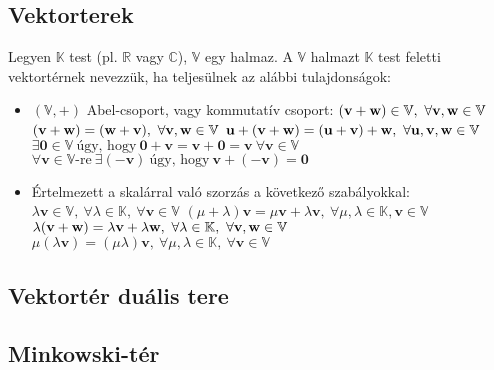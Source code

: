 \documentclass[a4paper,12pt]{article}
\begin{document}
\subsection{Vektorterek}
Legyen $\mathbb{K}$ test (pl. $\mathbb{R}$ vagy $\mathbb{C}$), $\mathbb{V}$ egy halmaz. A $\mathbb{V}$ halmazt $\mathbb{K}$ test feletti
vektortérnek nevezzük, ha teljesülnek az alábbi tulajdonságok:
\begin{itemize}
\item $(\mathbb{V}, +)$ Abel-csoport, vagy kommutatív csoport:
\subitem $(\mathbf{v} + \mathbf{w}) \in \mathbb{V}, ~ \forall \mathbf{v}, \mathbf{w} \in \mathbb{V}$
\subitem $(\mathbf{v} + \mathbf{w}) = (\mathbf{w} + \mathbf{v}), ~ \forall \mathbf{v}, \mathbf{w} \in \mathbb{V}$
\subitem $\mathbf{u} + (\mathbf{v} + \mathbf{w}) =(\mathbf{u} + \mathbf{v}) + \mathbf{w}, ~ \forall \mathbf{u},\mathbf{v}, \mathbf{w} \in \mathbb{V}$
\subitem $\exists \mathbf{0} \in \mathbb{V} ~ \textrm{úgy, hogy} ~ \mathbf{0} + \mathbf{v} = \mathbf{v} + \mathbf{0} = \mathbf{v} ~ \forall \mathbf{v}\in\mathbb{V}$
\subitem $ \forall \mathbf{v}\in\mathbb{V}\textrm{-re} ~ \exists (-\mathbf{v}) ~ \textrm{úgy, hogy} ~  \mathbf{v}+(-\mathbf{v})=\mathbf{0}$

\item Értelmezett a skalárral való szorzás a következő szabályokkal:
\subitem $\lambda \mathbf{v} \in \mathbb V, ~ \forall \lambda \in \mathbb{K}, ~ \forall \mathbf{v} \in \mathbb{V}$
\subitem $(\mu + \lambda) \mathbf{v} = \mu \mathbf{v} + \lambda\mathbf{v} , ~ \forall \mu, \lambda \in \mathbb{K}, \mathbf{v} \in \mathbb{V}$
\subitem $\lambda (\mathbf{v} + \mathbf{w}) = \lambda \mathbf{v} + \lambda \mathbf{w}, ~ \forall \lambda \in \mathbb{K}, ~ \forall \mathbf{v}, \mathbf{w} \in \mathbb{V}$
\subitem $\mu (\lambda \mathbf{v}) = (\mu \lambda)\mathbf{v} , ~ \forall \mu, \lambda \in \mathbb{K},~ \forall \mathbf{v} \in \mathbb{V}$

\end{itemize}

\subsection{Vektortér duális tere}
\subsection{Minkowski-tér}
\end{document}
